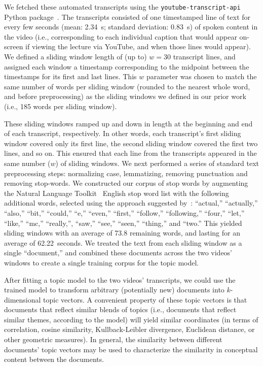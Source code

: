 \documentclass[10pt]{article}
\begin{document}
We fetched these automated transcripts using the
\texttt{youtube-transcript-api} Python package~\citep{Depo18}. The transcripts
consisted of one timestamped line of text for every few seconds (mean: 2.34~s;
standard deviation: 0.83~s) of spoken content in the video (i.e., corresponding
to each individual caption that would appear on-screen if viewing the lecture
via YouTube, and when those lines would appear). We defined a sliding window
length of (up to) $w = 30$ transcript lines, and assigned each window a
timestamp corresponding to the midpoint between the timestamps for its first
and last lines. This $w$ parameter was chosen to match the same number of words
per sliding window (rounded to the nearest whole word, and before
preprocessing) as the sliding windows we defined in our prior
work~\citep{HeusEtal21} (i.e., 185 words per sliding window).


These sliding windows ramped up and down in length at the beginning and end of
each transcript, respectively. In other words, each transcript's first sliding
window covered only its first line, the second sliding window covered the first
two lines, and so on. This ensured that each line from the transcripts appeared
in the same number ($w$) of sliding windows. We next performed a series of
standard text preprocessing steps: normalizing case, lemmatizing, removing
punctuation and removing stop-words. We constructed our corpus of stop words by
augmenting the Natural Language Toolkit~\citep[NLTK; ][]{BirdEtal09} English
stop word list with the following additional words, selected using the approach
suggested by~\citep{BoydMimn14}: ``actual,'' ``actually,'' ``also,'' ``bit,''
``could,'' ``e,'' ``even,'' ``first,'' ``follow,'' ``following,'' ``four,''
``let,'' ``like,'' ``mc,'' ``really,'', ``saw,'' ``see,'' ``seen,'' ``thing,''
and ``two.'' This yielded sliding windows with an average of 73.8 remaining
words, and lasting for an average of 62.22~seconds. We treated the text from
each sliding window as a single ``document,'' and combined these documents
across the two videos' windows to create a single training corpus for the topic
model.

After fitting a topic model to the two videos' transcripts, we could use the
trained model to transform arbitrary (potentially new) documents into
$k$-dimensional topic vectors. A convenient property of these topic vectors is
that documents that reflect similar blends of topics (i.e., documents that
reflect similar themes, according to the model) will yield similar coordinates
(in terms of correlation, cosine similarity, Kullback-Leibler divergence,
Euclidean distance, or other geometric measures). In general, the similarity
between different documents' topic vectors may be used to characterize the
similarity in conceptual content between the documents.
\end{document}
